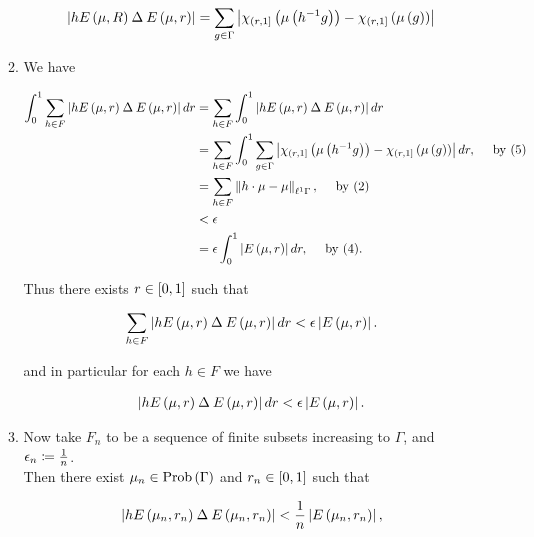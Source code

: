 \documentclass[a4paper,10pt]{report}
\begin{document}
\begin{enumerate}
\begin{enumerate}
                  \begin{align*}
                    \left| h E \left( \mu , R \right) \mathbin{\Delta} E \left( \mu , r \right) \right| = \sum_{g \in \Gamma} \left| \chi_{\left( r , 1 \right]} \left( \mu \left( h^{-1} g \right) \right) - \chi_{\left( r , 1 \right]} \left( \mu \left( g \right) \right) \right|
                  \end{align*}

		\item We have

                  \begin{align*}
                    \I_0^1 \sum_{h \in F} \MG h E \E \mu , r \R \symdif E \E \mu , r \R \GM dr%
                    &= \sum_{h \in F} \I_0^1 \MG h E \E \mu , r \R \symdif E \E \mu , r \R \GM dr\\
                    &= \sum_{h \in F} \I_0^1 \sum_{g \in \Gamma} \MG \chi_{\E r , 1 \FD} \E \mu \E h^{-1} g \R \R - \chi_{\E r , 1 \FD} \E \mu \E g \R \R \GM dr, \quad \te{ by (5)}\\
                    &= \sum_{h \in F} \NK h \cdot \mu - \mu \KN_{\ell^1 \Gamma}, \quad \te{ by (2)}\\
                    &< \ep \\
                    &= \ep \I_0^1 \MG E \E \mu , r \R \GM dr, \quad \te{ by (4)}.
                  \end{align*}

                  Thus there exists $r \in \left[ 0 , 1 \right]$ such that

                  \begin{align*}
                    \sum_{h \in F} \left| h E \left( \mu , r \right) \mathbin{\Delta} E \left( \mu , r \right) \right| dr < \epsilon \left| E \left( \mu , r \right) \right|.
                  \end{align*}

                  and in particular for each $h \in F$ we have

                  \begin{align*}
                    \left| h E \left( \mu , r \right) \mathbin{\Delta} E \left( \mu , r \right) \right| dr < \epsilon \left| E \left( \mu , r \right) \right|.
                  \end{align*}

		\item Now take $F_n$ to be a sequence of finite subsets increasing to $\Gamma$, and $\epsilon_n \coloneqq \frac{1}{n}$.\\
                  Then there exist $\mu_n \in \mathrm{Prob} \left( \Gamma \right)$ and $r_n \in \left[ 0 , 1 \right]$ such that

                  \begin{align*}
                    \left| h E \left( \mu_n , r_n \right) \mathbin{\Delta} E \left( \mu_n , r_n \right) \right| < \frac{1}{n} \left| E \left( \mu_n , r_n \right) \right|,
                  \end{align*}


\end{enumerate}
\end{enumerate}
\end{document}
